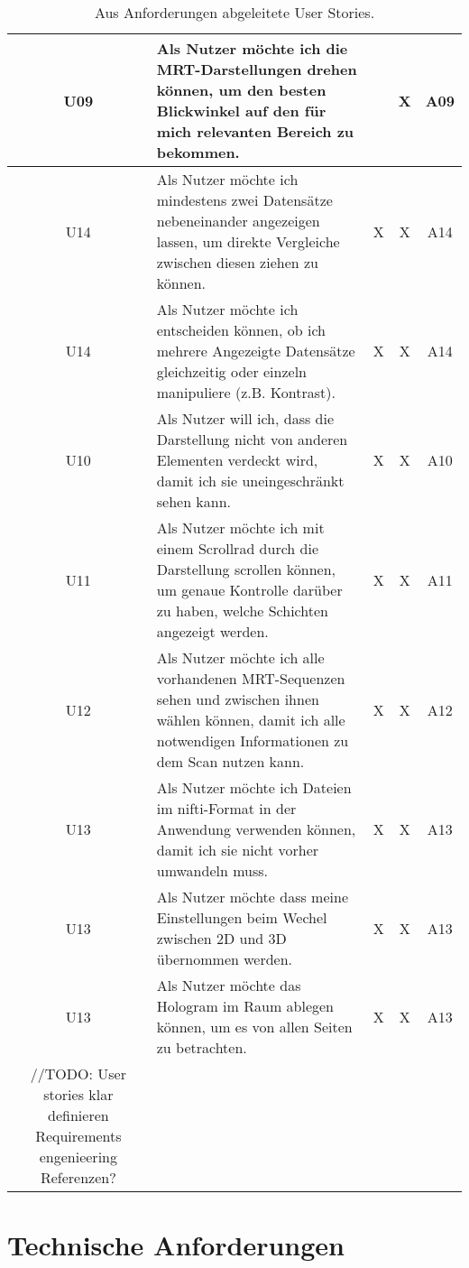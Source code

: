\begin{table}
\begin{tabular}{|c|p{10cm}|c|c|c|}
\hline
U09 & Als Nutzer möchte ich die MRT-Darstellungen drehen können, um den besten Blickwinkel auf den für mich relevanten Bereich zu bekommen. & & X & A09\\
\hline
U14 & Als Nutzer möchte ich mindestens zwei Datensätze nebeneinander angezeigen lassen, um direkte Vergleiche zwischen diesen ziehen zu können. & X & X & A14\\
\hline
U14 & Als Nutzer möchte ich entscheiden können, ob ich mehrere Angezeigte Datensätze gleichzeitig oder einzeln manipuliere (z.B. Kontrast). & X & X & A14\\
\hline
U10 & Als Nutzer will ich, dass die Darstellung nicht von anderen Elementen verdeckt wird, damit ich sie uneingeschränkt sehen kann. & X & X & A10\\
\hline
U11 & Als Nutzer möchte ich mit einem Scrollrad durch die Darstellung scrollen können, um genaue Kontrolle darüber zu haben, welche Schichten angezeigt werden. & X & X & A11\\
\hline
U12 & Als Nutzer möchte ich alle vorhandenen MRT-Sequenzen sehen und zwischen ihnen wählen können, damit ich alle notwendigen Informationen zu dem Scan nutzen kann. & X & X & A12\\
\hline
U13 & Als Nutzer möchte ich Dateien im nifti-Format in der Anwendung verwenden können, damit ich sie nicht vorher umwandeln muss. & X & X & A13\\
\hline
U13 & Als Nutzer möchte dass meine Einstellungen beim Wechel zwischen 2D und 3D übernommen werden. & X & X & A13\\
\hline
U13 & Als Nutzer möchte das Hologram im Raum ablegen können, um es von allen Seiten zu betrachten. & X & X & A13\\
\hline

//TODO:
User stories klar definieren
Requirements engenieering 
Referenzen?

\end{tabular}
\caption{\label{tab:table-name}Aus Anforderungen abgeleitete User Stories.}
\end{table}

\section{Technische Anforderungen}
